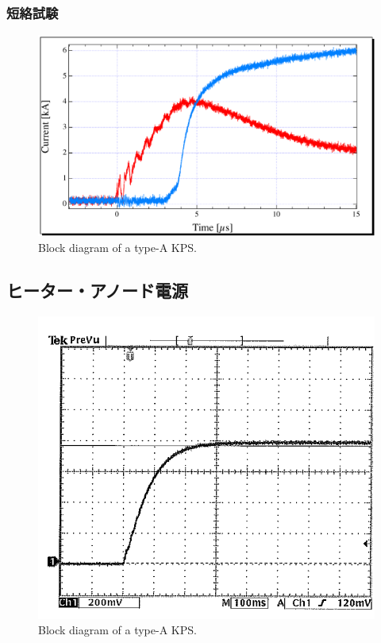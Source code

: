 \documentclass[10pt,a4paper,book,openany]{jlreq}
\theoremstyle{definition}
\begin{document}
\subsubsection{短絡試験}
\begin{figure}[!htt]
    \begin{center}
        \includegraphics[width=12cm,clip]{figs/sc_test.pdf}
        \caption{Block diagram of a type-A KPS.}
        \label{sctest}
    \end{center}
\end{figure}

\subsection{ヒーター・アノード電源}

\begin{figure}[!htt]
    \begin{center}
        \includegraphics[width=12cm,clip]{figs/anode_rise.png}
        \caption{Block diagram of a type-A KPS.}
        \label{anode}
    \end{center}
\end{figure}
\end{document}
